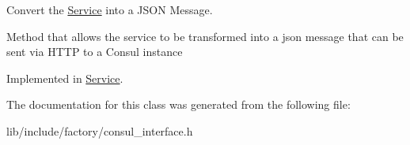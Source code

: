 Convert the \hyperlink{classService}{Service} into a J\-S\-O\-N Message. 

Method that allows the service to be transformed into a json message that can be sent via H\-T\-T\-P to a Consul instance 

Implemented in \hyperlink{classService_a4a9e3ab8b1e7c82a7f624022906410f4}{Service}.



The documentation for this class was generated from the following file\-:\begin{DoxyCompactItemize}
\item 
lib/include/factory/consul\-\_\-interface.\-h\end{DoxyCompactItemize}
